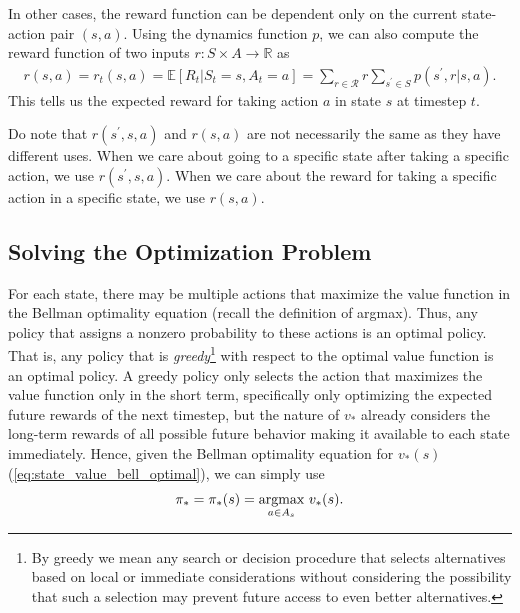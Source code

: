 In other cases, the reward function can be dependent only on the current state-action pair $(s,a)$.
Using the dynamics function $p$, we can also compute the reward function of two inputs $r:S\times A\to\mathbb{R}$ as
\begin{align}
    r(s,a)=r_t(s,a) = \mathbb{E}[R_{t}|S_t=s, A_t=a] = \sum_{r\in\mathcal{R}} r \sum_{s^\prime\in S} p(s^\prime, r|s,a).
    \label{eq:MDP_reward_two_inputs}
\end{align}
This tells us the expected reward for taking action $a$ in state $s$ at timestep $t$.

Do note that $r(s^\prime,s,a)$ and $r(s,a)$ are not necessarily the same as they have different uses.
When we care about going to a specific state after taking a specific action, we use $r(s^\prime,s,a)$.
When we care about the reward for taking a specific action in a specific state, we use $r(s,a)$.

\subsection*{Solving the Optimization Problem}
For each state, there may be multiple actions that maximize the value function in the Bellman optimality equation (recall the definition of argmax).
Thus, any policy that assigns a nonzero probability to these actions is an optimal policy.
That is, any policy that is \emph{greedy}\footnote{By greedy we mean any search or decision procedure that selects alternatives based on local or immediate considerations without considering the possibility that such a selection may prevent future access to even better alternatives.} with respect to the optimal value function is an optimal policy.
A greedy policy only selects the action that maximizes the value function only in the short term, specifically only optimizing the expected future rewards of the next timestep, but the nature of $v_*$ already considers the long-term rewards of all possible future behavior making it available to each state immediately.
Hence, given the Bellman optimality equation for $v_*(s)$ (\ref{eq:state_value_bell_optimal}), we can simply use
\begin{align}
    \pi_*=\pi_*(s)=\underset{a\in A_s}{\mbox{argmax}}\text{ } v_*(s).
    \label{eq:optimal_policy_value_def}
\end{align}

